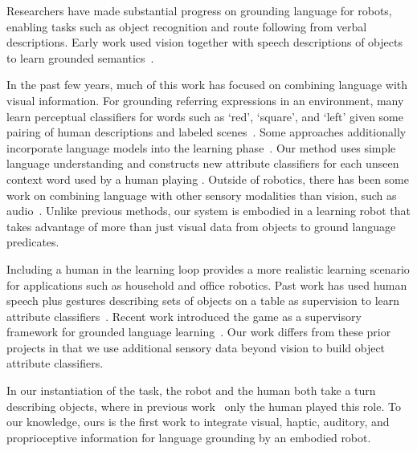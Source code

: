 Researchers have made substantial progress on grounding language for robots, enabling tasks such as object recognition and route following from verbal descriptions.
Early work used vision together with speech descriptions of objects to learn grounded semantics~\cite{roy:cogsci02}.

In the past few years, much of this work has focused on combining language with visual information.
For grounding referring expressions in an environment, many learn perceptual classifiers for words such as `red', `square', and `left' given some pairing of human descriptions and labeled scenes~\cite{liu:acl14,malinowski:nips14,mohan:acs13,sun:icra13,dindo:iros10,vogel:aaai10}.
Some approaches additionally incorporate language models into the learning phase~\cite{spranger:ijcai15,krishnamurthy:acl13,perera:aaai13,matuszek:icml12}.
Our method uses simple language understanding and constructs new attribute classifiers for each unseen context word used by a human playing \ispy.
Outside of robotics, there has been some work on combining language with other sensory modalities than vision, such as audio~\cite{kiela:emnlp15}.
Unlike previous methods, our system is embodied in a learning robot that takes advantage of more than just visual data from objects to ground language predicates.

Including a human in the learning loop provides a more realistic learning scenario for applications such as household and office robotics.
Past work has used human speech plus gestures describing sets of objects on a table as supervision to learn attribute classifiers~\cite{matuszek:aaai14,kollar:rss13}. Recent work introduced the \ispy game as a supervisory framework for grounded language learning~\cite{parde:ijcai15}.
Our work differs from these prior projects in that we use additional sensory data beyond vision to build object attribute classifiers.

In our instantiation of the \ispy task, the robot and the human both take a turn describing objects, where in previous work~\cite{parde:ijcai15} only the human played this role.
To our knowledge, ours is the first work to integrate visual, haptic, auditory, and proprioceptive information for language grounding by an embodied robot.


